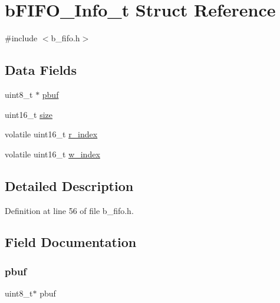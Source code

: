 \hypertarget{structb_f_i_f_o___info__t}{}\section{b\+F\+I\+F\+O\+\_\+\+Info\+\_\+t Struct Reference}
\label{structb_f_i_f_o___info__t}


{\ttfamily \#include $<$b\+\_\+fifo.\+h$>$}

\subsection*{Data Fields}
\begin{DoxyCompactItemize}
\item 
uint8\+\_\+t $\ast$ \mbox{\hyperlink{structb_f_i_f_o___info__t_a1a31631f37dee0a497a399375ddf4898}{pbuf}}
\item 
uint16\+\_\+t \mbox{\hyperlink{structb_f_i_f_o___info__t_aaba88b24a21a6c70c895c0d55f4a69a0}{size}}
\item 
volatile uint16\+\_\+t \mbox{\hyperlink{structb_f_i_f_o___info__t_a57db0a4d3ff20bcc56f76881c520f4f6}{r\+\_\+index}}
\item 
volatile uint16\+\_\+t \mbox{\hyperlink{structb_f_i_f_o___info__t_aab577f4558bd899926454eff3636f637}{w\+\_\+index}}
\end{DoxyCompactItemize}


\subsection{Detailed Description}


Definition at line 56 of file b\+\_\+fifo.\+h.



\subsection{Field Documentation}
\mbox{\label{structb_f_i_f_o___info__t_a1a31631f37dee0a497a399375ddf4898}} 
\subsubsection{\texorpdfstring{pbuf}{pbuf}}
{\footnotesize\ttfamily uint8\+\_\+t$\ast$ pbuf}



